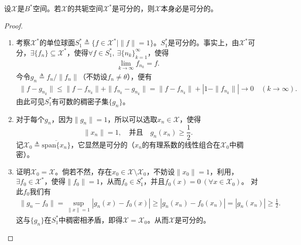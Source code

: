\documentclass[../../main.tex]{subfiles}%
\begin{document}
\begin{theorem}[Banach定理]\label{theorem:泛函分析--Banach定理11}
设$\mathscr{X}$是$B^*$空间。若$\mathscr{X}$的共轭空间$\mathscr{X}^*$是可分的，则$\mathscr{X}$本身必是可分的。
\end{theorem}
\begin{proof}
\begin{enumerate}[(1)]
\item 考察$\mathscr{X}^*$的单位球面$S_1^*\triangleq\{f\in\mathscr{X}^*|\|f\|=1\}$。$S_1^*$是可分的。事实上，由$\mathscr{X}^*$可分，$\exists\{f_n\}\subseteq\mathscr{X}^*$，使得$\forall f\in S_1^*,\ \exists\{n_k\}_{k=1}^{\infty}$，使得
\begin{align*}
\lim\limits_{k\to\infty}f_{n_k}=f.
\end{align*}
今令$g_n\triangleq f_n/\|f_n\|$（不妨设$f_n\neq\theta$），便有
\begin{align*}
\|f-g_{n_k}\|\leqslant\|f-f_{n_k}\|+\|f_{n_k}-g_{n_k}\|=\|f-f_{n_k}\|+|1-\|f_{n_k}\||\to0\quad(k\to\infty).
\end{align*}
由此可见$S_1^*$有可数的稠密子集$\{g_n\}$。

\item 对于每个$g_n$，因为$\|g_n\|=1$，所以可以选取$x_n\in\mathscr{X}$，使得
$$\|x_n\|=1,\quad\text{并且}\quad g_n(x_n)\geqslant\frac{1}{2}.$$
记$\mathscr{X}_0\triangleq\overline{\mathrm{span}\{x_n\}}$，它显然是可分的（$x_n$的有理系数的线性组合在$\mathscr{X}_0$中稠密）。

\item 证明$\mathscr{X}_0=\mathscr{X}$。倘若不然，存在$x_0\in\mathscr{X}\setminus\mathscr{X}_0$，不妨设$\|x_0\|=1$，利用，$\exists f_0\in\mathscr{X}^*$，使得$\|f_0\|=1$，从而$f_0\in S_1^*$，并且$f_0(x)=0\ (\forall x\in\mathscr{X}_0)$。
对此$f_0$我们有
\begin{align*}
\|g_n-f_0\|=\sup\limits_{\|x\|=1}|g_n(x)-f_0(x)|
\geqslant|g_n(x_n)-f_0(x_n)|=|g_n(x_n)|\geqslant\frac{1}{2}.
\end{align*}
这与$\{g_n\}$在$S_1^*$中稠密相矛盾，即得$\mathscr{X}=\mathscr{X}_0$。从而$\mathscr{X}$是可分的。
\end{enumerate}

\end{proof}
\end{document}
